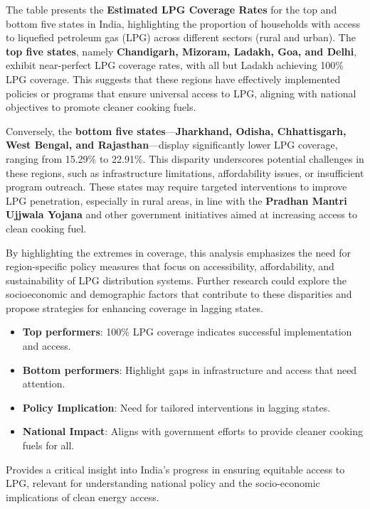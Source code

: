 \documentclass{article}
\begin{document}
The table presents the \textbf{Estimated LPG Coverage Rates} for the top and bottom five states in India, highlighting the proportion of households with access to liquefied petroleum gas (LPG) across different sectors (rural and urban). The \textbf{top five states}, namely \textbf{Chandigarh, Mizoram, Ladakh, Goa, and Delhi}, exhibit near-perfect LPG coverage rates, with all but Ladakh achieving 100\% LPG coverage. This suggests that these regions have effectively implemented policies or programs that ensure universal access to LPG, aligning with national objectives to promote cleaner cooking fuels.

Conversely, the \textbf{bottom five states}—\textbf{Jharkhand, Odisha, Chhattisgarh, West Bengal, and Rajasthan}—display significantly lower LPG coverage, ranging from 15.29\% to 22.91\%. This disparity underscores potential challenges in these regions, such as infrastructure limitations, affordability issues, or insufficient program outreach. These states may require targeted interventions to improve LPG penetration, especially in rural areas, in line with the \textbf{Pradhan Mantri Ujjwala Yojana} and other government initiatives aimed at increasing access to clean cooking fuel.

By highlighting the extremes in coverage, this analysis emphasizes the need for region-specific policy measures that focus on accessibility, affordability, and sustainability of LPG distribution systems. Further research could explore the socioeconomic and demographic factors that contribute to these disparities and propose strategies for enhancing coverage in lagging states.

\vspace{0.3cm}

\begin{itemize}
	\item \textbf{Top performers}: 100\% LPG coverage indicates successful implementation and access.
	\item \textbf{Bottom performers}: Highlight gaps in infrastructure and access that need attention.
	\item \textbf{Policy Implication}: Need for tailored interventions in lagging states.
	\item \textbf{National Impact}: Aligns with government efforts to provide cleaner cooking fuels for all.
\end{itemize}

Provides a critical insight into India's progress in ensuring equitable access to LPG, relevant for understanding national policy and the socio-economic implications of clean energy access.
\end{document}
